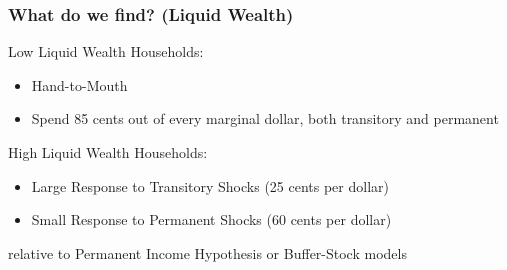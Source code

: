 \documentclass{beamer}
\begin{document}
\frame
{
	\frametitle{What do we find? (Liquid Wealth)}
	Low Liquid Wealth Households:
	\begin{itemize}
		\item Hand-to-Mouth
		\item Spend 85 cents out of every marginal dollar, both transitory and permanent
	\end{itemize}
	\bigskip
	\pause
	High Liquid Wealth Households: 
	\begin{itemize}
		\item Large Response to Transitory Shocks (25 cents per dollar)
		\item Small Response to Permanent Shocks (60 cents per dollar)
	\end{itemize}
	relative to Permanent Income Hypothesis or Buffer-Stock models
}
\end{document}
